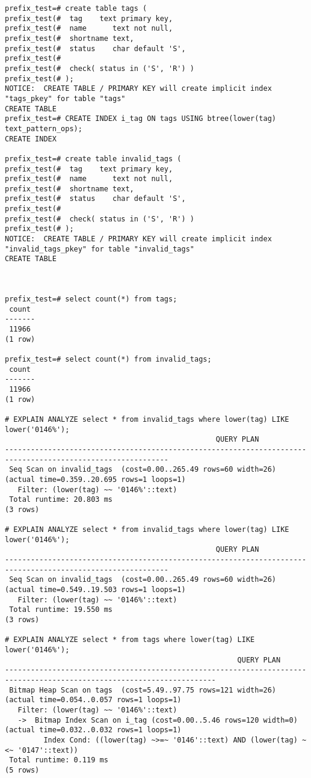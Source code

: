 \begin{lstlisting}[label=lst:snippets14,title=snippets/speed\_like.sql]
prefix_test=# create table tags (
prefix_test(#  tag    text primary key,
prefix_test(#  name      text not null,
prefix_test(#  shortname text,
prefix_test(#  status    char default 'S',
prefix_test(#
prefix_test(#  check( status in ('S', 'R') )
prefix_test(# );
NOTICE:  CREATE TABLE / PRIMARY KEY will create implicit index "tags_pkey" for table "tags"
CREATE TABLE
prefix_test=# CREATE INDEX i_tag ON tags USING btree(lower(tag)  text_pattern_ops);
CREATE INDEX

prefix_test=# create table invalid_tags (
prefix_test(#  tag    text primary key,
prefix_test(#  name      text not null,
prefix_test(#  shortname text,
prefix_test(#  status    char default 'S',
prefix_test(#
prefix_test(#  check( status in ('S', 'R') )
prefix_test(# );
NOTICE:  CREATE TABLE / PRIMARY KEY will create implicit index "invalid_tags_pkey" for table "invalid_tags"
CREATE TABLE



prefix_test=# select count(*) from tags;
 count
-------
 11966
(1 row)

prefix_test=# select count(*) from invalid_tags;
 count
-------
 11966
(1 row)

# EXPLAIN ANALYZE select * from invalid_tags where lower(tag) LIKE lower('0146%');
                                                 QUERY PLAN
------------------------------------------------------------------------------------------------------------
 Seq Scan on invalid_tags  (cost=0.00..265.49 rows=60 width=26) (actual time=0.359..20.695 rows=1 loops=1)
   Filter: (lower(tag) ~~ '0146%'::text)
 Total runtime: 20.803 ms
(3 rows)

# EXPLAIN ANALYZE select * from invalid_tags where lower(tag) LIKE lower('0146%');
                                                 QUERY PLAN
------------------------------------------------------------------------------------------------------------
 Seq Scan on invalid_tags  (cost=0.00..265.49 rows=60 width=26) (actual time=0.549..19.503 rows=1 loops=1)
   Filter: (lower(tag) ~~ '0146%'::text)
 Total runtime: 19.550 ms
(3 rows)

# EXPLAIN ANALYZE select * from tags where lower(tag) LIKE lower('0146%');
                                                      QUERY PLAN
-----------------------------------------------------------------------------------------------------------------------
 Bitmap Heap Scan on tags  (cost=5.49..97.75 rows=121 width=26) (actual time=0.054..0.057 rows=1 loops=1)
   Filter: (lower(tag) ~~ '0146%'::text)
   ->  Bitmap Index Scan on i_tag (cost=0.00..5.46 rows=120 width=0) (actual time=0.032..0.032 rows=1 loops=1)
         Index Cond: ((lower(tag) ~>=~ '0146'::text) AND (lower(tag) ~<~ '0147'::text))
 Total runtime: 0.119 ms
(5 rows)


\end{lstlisting}
